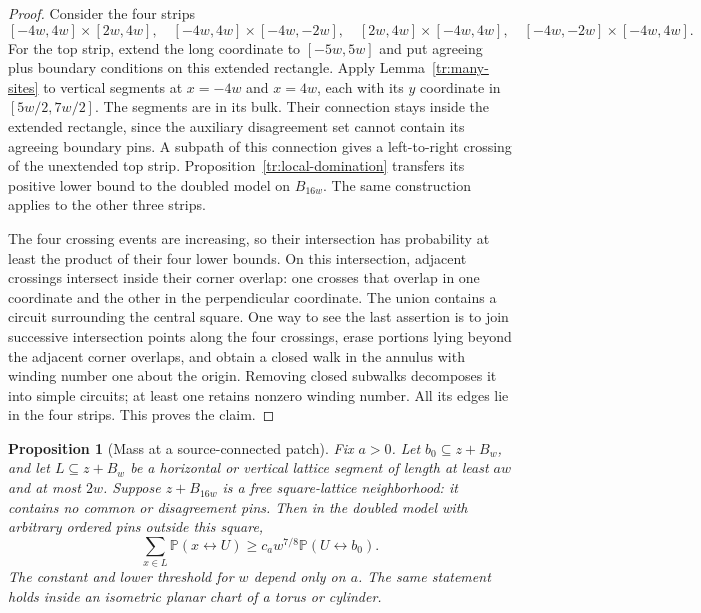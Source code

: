 \documentclass[11pt]{article}
\newtheorem{proposition}[theorem]{Proposition}
\theoremstyle{definition}
\theoremstyle{remark}
\numberwithin{equation}{section}
\begin{document}
\begin{proof}
Consider the four strips
\[
 [-4w,4w]\times[2w,4w],\quad
 [-4w,4w]\times[-4w,-2w],\quad
 [2w,4w]\times[-4w,4w],\quad
 [-4w,-2w]\times[-4w,4w].
\]
For the top strip, extend the long coordinate to $[-5w,5w]$ and put
agreeing plus boundary conditions on this extended rectangle. Apply
Lemma~\ref{tr:many-sites} to vertical segments at $x=-4w$ and $x=4w$,
each with its $y$ coordinate in $[5w/2,7w/2]$. The segments are in its
bulk. Their connection stays inside the extended rectangle, since the
auxiliary disagreement set cannot contain its agreeing boundary pins.
A subpath of this connection gives a left-to-right crossing of the
unextended top strip. Proposition~\ref{tr:local-domination} transfers
its positive lower bound to the doubled model on $B_{16w}$. The same
construction applies to the other three strips.

The four crossing events are increasing, so their intersection has
probability at least the product of their four lower bounds. On this
intersection, adjacent crossings intersect inside their corner overlap:
one crosses that overlap in one coordinate and the other in the
perpendicular coordinate. The union contains a circuit surrounding the
central square. One way to see the last assertion is to join successive
intersection points along the four crossings, erase portions lying beyond
the adjacent corner overlaps, and obtain a closed walk in the annulus
with winding number one about the origin. Removing closed subwalks
decomposes it into simple circuits; at least one retains nonzero winding
number. All its edges lie in the four strips. This proves the claim.
\end{proof}

\begin{proposition}[Mass at a source-connected patch]
\label{tr:mass}
Fix $a>0$. Let $b_0\subseteq z+B_w$, and let $L\subseteq z+B_w$ be a
horizontal or vertical lattice segment of length at least $aw$ and at
most $2w$. Suppose $z+B_{16w}$ is a free square-lattice neighborhood:
it contains no common or disagreement pins. Then in the doubled model
with arbitrary ordered pins outside this square,
\begin{equation}
\label{tr:mass-eq}
 \sum_{x\in L}\mathbb P(x\longleftrightarrow U)
 \geq c_a w^{7/8}\mathbb P(U\longleftrightarrow b_0).
\end{equation}
The constant and lower threshold for $w$ depend only on $a$. The same
statement holds inside an isometric planar chart of a torus or cylinder.
\end{proposition}
\end{document}
